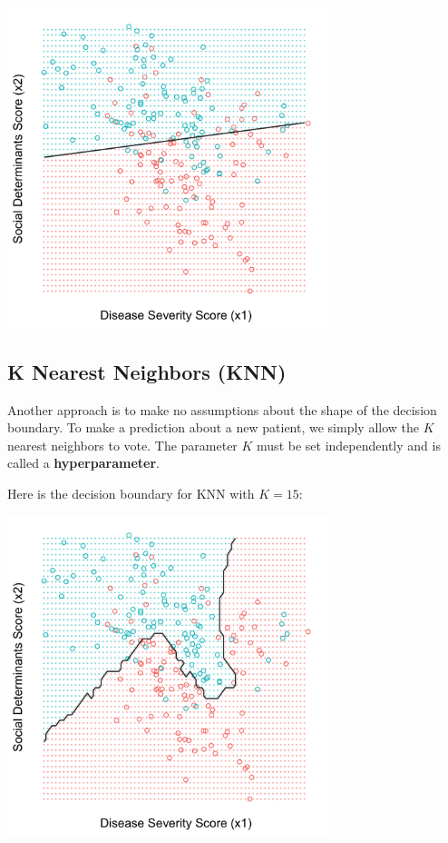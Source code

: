 \begin{center}
\includegraphics[width=0.7\textwidth]{img/esl-logistic.png}
\end{center}

\subsection{K Nearest Neighbors (KNN)}

Another approach is to make no assumptions about the shape of the decision boundary. To make a prediction about a new patient, we simply allow the $K$ nearest neighbors to vote. The parameter $K$ must be set independently and is called a \textbf{hyperparameter}. 

\noindent Here is the decision boundary for KNN with $K=15$:
\begin{center}
\includegraphics[width=0.7\textwidth]{img/esl-knn-15.png}
\end{center}

